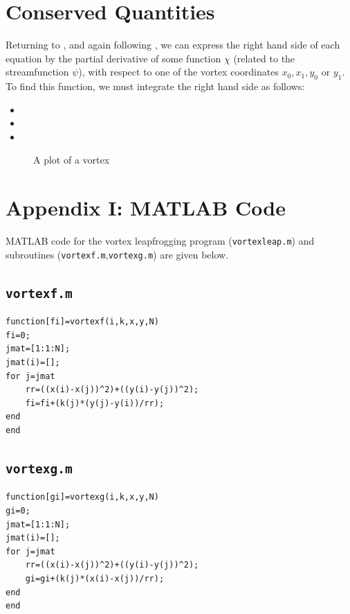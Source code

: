 \documentclass[10pt, a4paper]{article}
\numberwithin{equation}{section}
\begin{document}
\section{Conserved Quantities}
Returning to , and again following \citeauthor{love94}, we can express the right hand side of each equation by the partial derivative of some function $\chi$ (related to the streamfunction $\psi$), with respect to one of the vortex coordinates $x_0,x_1,y_0$ or $y_1$.
To find this function, we must integrate the right hand side as follows:
\begin{itemize}
\item 
\item 
\item 

\end{itemize}
\begin{figure}
	\centering
	\newlength\figureheight 
	\newlength\figurewidth 
	\setlength\figureheight{10cm} 
	\setlength\figurewidth{\textwidth}
	
	\caption{A plot of a vortex}
	\label{fig:vortest}
\end{figure}
\clearpage
\section*{Appendix I: MATLAB Code}\label{sec:ap1}
MATLAB code for the vortex leapfrogging program (\texttt{vortexleap.m}\normalfont) and subroutines (\texttt{vortexf.m}\normalfont,\texttt{vortexg.m}) are given below.
\subsection*{\texttt{vortexf.m}}
\label{vortexf}
\begin{verbatim}
function[fi]=vortexf(i,k,x,y,N)
fi=0;
jmat=[1:1:N];
jmat(i)=[];
for j=jmat
    rr=((x(i)-x(j))^2)+((y(i)-y(j))^2);
    fi=fi+(k(j)*(y(j)-y(i))/rr);
end
end
\end{verbatim}
\subsection*{\texttt{vortexg.m}}
\label{vortexg}
\begin{verbatim}
function[gi]=vortexg(i,k,x,y,N)
gi=0;
jmat=[1:1:N];
jmat(i)=[];
for j=jmat
    rr=((x(i)-x(j))^2)+((y(i)-y(j))^2);
    gi=gi+(k(j)*(x(i)-x(j))/rr);
end
end
\end{verbatim}
\end{document}
